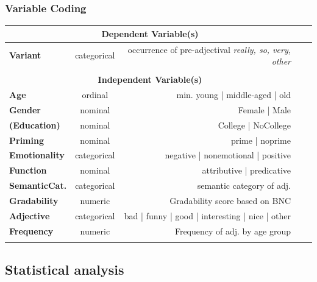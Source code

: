 \documentclass[12pt, table]{beamer}
\begin{document}
\begin{frame}
\frametitle{Variable Coding} 
\scriptsize{
\begin{tabularx}{\textwidth}{lcrrr}
\multicolumn{3}{c}{\textbf{Dependent Variable(s)}} \\\hline 
\textbf{Variant} & categorical & occurrence of pre-adjectival \textit{really, so, very, other} \\
\hline\\
\multicolumn{3}{c}{\textbf{Independent Variable(s)}} \\\hline
\textbf{Age} & ordinal & min. young | middle-aged | old & \parbox[t]{2mm}{} & \parbox[t]{2mm}{}\\
\textbf{Gender} & nominal & Female | Male & &\\
\textbf{(Education)} & nominal & College | NoCollege & &\\
\hline
\textbf{Priming} & nominal & prime | noprime & &\\
\hline
\textbf{Emotionality} & categorical & negative | nonemotional | positive & \parbox[t]{2mm}{} & \parbox[t]{2mm}{}\\
\textbf{Function} & nominal & attributive | predicative & & \\
\textbf{SemanticCat.} & categorical & semantic category of adj. & & \\
\textbf{Gradability} & numeric & Gradability score based on BNC & & \\
\textbf{Adjective} & categorical & bad | funny | good | interesting | nice | other & & \\
\textbf{Frequency} & numeric & Frequency of adj. by age group & & \\
\hline
\end{tabularx}
}
\end{frame}

\subsection{Statistical analysis}
\begin{frame}
\begin{center}
\begin{large}
\end{large}
\end{center}
\end{frame}
\end{document}
